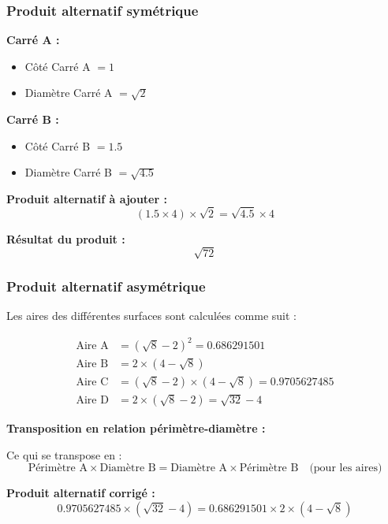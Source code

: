 \documentclass[a4paper,11pt]{article}
\newenvironment{exemple}[1][]{%
    \begin{tcolorbox}[colback=green!5,colframe=holgreen,title={\textbf{Exemple #1}}]
}{%
    \end{tcolorbox}
}
\begin{document}
\subsubsection{Produit alternatif symétrique}

\begin{exemple}[: Calcul du produit alternatif symétrique]

\textbf{Carré A :}
\begin{itemize}
    \item Côté Carré A $= 1$
    \item Diamètre Carré A $= \sqrt{2}$
\end{itemize}

\textbf{Carré B :}
\begin{itemize}
    \item Côté Carré B $= 1.5$
    \item Diamètre Carré B $= \sqrt{4.5}$
\end{itemize}

\textbf{Produit alternatif à ajouter :}
\[
(1.5 \times 4) \times \sqrt{2} = \sqrt{4.5} \times 4
\]

\textbf{Résultat du produit :}
\[
\sqrt{72}
\]
\end{exemple}

\subsubsection{Produit alternatif asymétrique}

\begin{exemple}[: Calcul des aires -- Corrigé]
Les aires des différentes surfaces sont calculées comme suit :

\begin{align}
\text{Aire A} &= (\sqrt{8} - 2)^2 = 0.686291501 \\
\text{Aire B} &= 2 \times (4 - \sqrt{8}) \\
\text{Aire C} &= (\sqrt{8} - 2) \times (4 - \sqrt{8}) = 0.9705627485 \\
\text{Aire D} &= 2 \times (\sqrt{8} - 2) = \sqrt{32} - 4
\end{align}
\end{exemple}

\textbf{Transposition en relation périmètre-diamètre :}

Ce qui se transpose en :
\[
\text{Périmètre A} \times \text{Diamètre B} = \text{Diamètre A} \times \text{Périmètre B} \quad \text{(pour les aires)}
\]

\textbf{Produit alternatif corrigé :}
\[
0.9705627485 \times (\sqrt{32} - 4) = 0.686291501 \times 2 \times (4 - \sqrt{8})
\]
\end{document}

